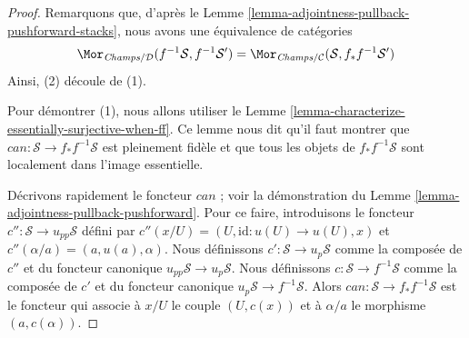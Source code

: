 \begin{proof}
Remarquons que, d'après le
Lemme \ref{lemma-adjointness-pullback-pushforward-stacks},
nous avons une équivalence de catégories
$$
\Mor_{\textit{Champs}/\mathcal{D}}(f^{-1}\mathcal{S}, f^{-1}\mathcal{S}')
=
\Mor_{\textit{Champs}/\mathcal{C}}(\mathcal{S}, f_*f^{-1}\mathcal{S}')
$$
Ainsi, (2) découle de (1).

\medskip\noindent
Pour démontrer (1), nous allons utiliser le
Lemme \ref{lemma-characterize-essentially-surjective-when-ff}.
Ce lemme nous dit qu'il faut montrer que
$can : \mathcal{S} \to f_*f^{-1}\mathcal{S}$ est
pleinement fidèle et que tous les objets de $f_*f^{-1}\mathcal{S}$
sont localement dans l'image essentielle.

\medskip\noindent
Décrivons rapidement le foncteur $can$ ; voir la démonstration du
Lemme \ref{lemma-adjointness-pullback-pushforward}.
Pour ce faire, introduisons le foncteur
$c'' : \mathcal{S} \to u_{pp}\mathcal{S}$ défini par
$c''(x/U) = (U, \text{id} : u(U) \to u(U), x)$ et
$c''(\alpha/a) = (a, u(a), \alpha)$. Nous définissons
$c' : \mathcal{S} \to u_p\mathcal{S}$ comme la composée
de $c''$ et du foncteur canonique $u_{pp}\mathcal{S} \to u_p\mathcal{S}$.
Nous définissons $c : \mathcal{S} \to f^{-1}\mathcal{S}$ comme la composée
de $c'$ et du foncteur canonique $u_p\mathcal{S} \to f^{-1}\mathcal{S}$.
Alors $can : \mathcal{S} \to f_*f^{-1}\mathcal{S}$ est le foncteur
qui associe à $x/U$ le couple $(U, c(x))$ et à
$\alpha/a$ le morphisme $(a, c(\alpha))$.


\end{proof}
